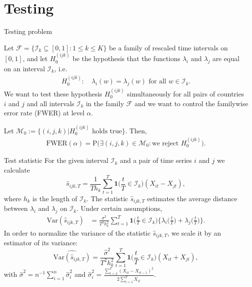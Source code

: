 \documentclass[10pt]{beamer}
\newcommand{\Prob}{\mathrm{P}}
\newcommand{\Var}{\mathrm{Var}}
\newcommand{\ind}{\boldsymbol{1}\Big( \frac{t}{T} \in \mathcal{I}_k \Big)} %
\begin{document}
\section{Testing}
\begin{frame}{Testing problem}

Let $\mathcal{F} =\{ \mathcal{I}_k \subseteq [0, 1]: 1 \le k \le K\}$ be a family of rescaled time intervals on $[0, 1]$, and let $H_0^{(ijk)}$ be the hypothesis that the functions $\lambda_i$ and $\lambda_j$ are equal on an interval $\mathcal{I}_k$, i.e.
\begin{align*}
H_0^{(ijk)}:\quad  \lambda_i(w) = \lambda_j(w) \text{ for all } w\in \mathcal{I}_k.
\end{align*}\pause
We want to test these hypothesis $H_0^{(ijk)}$ simultaneously for all pairs of countries $i$ and $j$ and all intervals $\mathcal{I}_k$ in the family $\mathcal{F}$ and we want to control the familywise error rate (FWER) at level $\alpha$.\pause

Let $\mathcal{M}_0 := \big\{(i, j, k)\big| H_0^{(ijk)} \text{ holds true}\big\}$. Then,
\begin{align*}
\text{FWER}(\alpha) = \Prob \Big( \exists (i,j,k) \in \mathcal{M}_0: \text{we reject } H_0^{(ijk)} \Big).
\end{align*}
\end{frame} 


\begin{frame}{Test statistic}
For the given interval $\mathcal{I}_k$ and a pair of time series $i$ and $j$ we calculate
\begin{equation*}
\hat{s}_{ijk,T} = \frac{1}{T h_k} \sum\limits_{t=1}^T \ind (X_{it} -X_{jt}), 
\end{equation*}
where $h_k$ is the length of $\mathcal{I}_k$. \pause The statistic $\hat{s}_{ijk,T}$ estimates the average distance between $\lambda_i$ and $\lambda_j$ on $\mathcal{I}_k$. \pause Under certain assumptions, 
\begin{align*}
\Var(\hat{s}_{ijk,T})  & = \frac{\sigma^2}{T^2 h_k^2} \sum\limits_{t=1}^T \ind \Big\{ \lambda_i\Big(\frac{t}{T}\Big) + \lambda_j\Big(\frac{t}{T}\Big) \Big\}. 
\end{align*}\pause
In order to normalize the variance of the statistic $\hat{s}_{ijk,T}$, we scale it by an estimator of its variance:
\[ \widehat{\Var(\hat{s}_{ijk,T})} = \frac{\hat{\sigma}^2}{T^2 h_k^2} \sum\limits_{t=1}^T \ind (X_{it} + X_{jt} ), \]
with $\hat{\sigma}^2 = n^{-1} \sum_{i = 1}^n \hat{\sigma}_i^2$ and $\hat{\sigma}_i^2 = \frac{\sum_{t=2}^T (X_{it}-X_{it-1})^2}{2 \sum_{t=1}^T X_{it}}$.\hyperlink{frame_sigma}{}
\end{frame}
\end{document}
